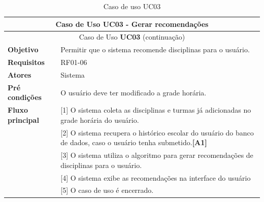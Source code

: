 \begin{longtable}{ | m{} | m{} | }
    \hline\hline
    \multicolumn{2}{|c|}{Caso de Uso \textbf{UC03} - Gerar recomendações}\tabularnewline\hline\hline\endfirsthead
    \hline\hline
    \multicolumn{2}{|c|}{Caso de Uso \textbf{UC03} (continuação)}\tabularnewline\hline\hline\endhead
    \hline\endfoot
    \hline\caption{Caso de uso UC03}\endlastfoot

    \textbf{Objetivo} & Permitir que o sistema recomende disciplinas para o usuário.\tabularnewline\hline 
    \textbf{Requisitos} & RF01-06\tabularnewline\hline
    \textbf{Atores} & Sistema\tabularnewline\hline
    \textbf{Pré condições} & O usuário deve ter modificado a grade horária.\tabularnewline\hline

    \multirow{1}{*}{\textbf{Fluxo principal}} & [1] O sistema coleta as disciplinas e turmas já adicionadas no grade horária do usuário.\tabularnewline\cline{2-2}
    & [2] O sistema recupera o histórico escolar do usuário do banco de dados, caso o usuário tenha submetido.\textbf{[A1]}\tabularnewline\cline{2-2}
    & [3] O sistema utiliza o algoritmo para gerar recomendações de disciplinas para o usuário.\tabularnewline\cline{2-2}
    & [4] O sistema exibe as recomendações na interface do usuário\tabularnewline\cline{2-2}
    & [5] O caso de uso é encerrado.
    \label{tab:uc03}
\end{longtable}



